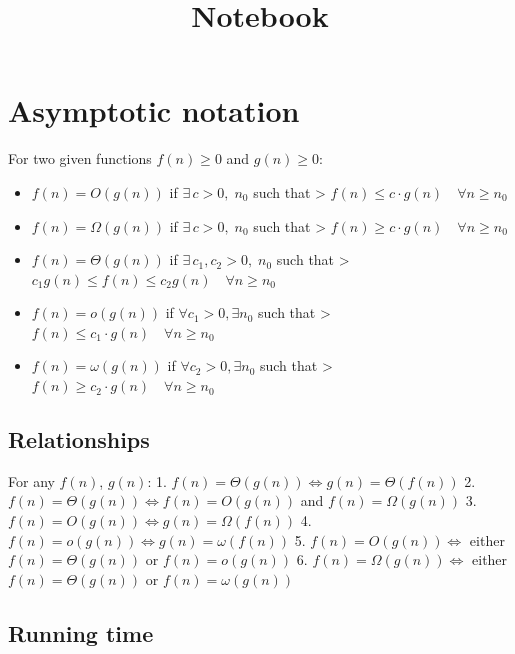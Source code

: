 \documentclass[11pt]{article}
\title{Notebook}
\date{}
\begin{document}
    
    \maketitle
    
    

    \tableofcontents
    \newpage

    
    \section{Asymptotic notation}\label{asymptotic-notation}

For two given functions \(f(n) \geq 0\) and \(g(n) \geq 0\):

\begin{itemize}
\item
  \(f(n) = O(g(n))\) if \(\exists\, c > 0,\; n_0\) such that
  \textgreater{} \(f(n) \le c \cdot g(n) \quad \forall n \ge n_0\)
\item
  \(f(n) = \Omega(g(n))\) if \(\exists\, c > 0,\; n_0\) such that
  \textgreater{} \(f(n) \ge c \cdot g(n) \quad \forall n \ge n_0\)
\item
  \(f(n) = \Theta(g(n))\) if \(\exists\, c_1, c_2 > 0,\; n_0\) such that
  \textgreater{}
  \(c_1 g(n) \le f(n) \le c_2 g(n) \quad \forall n \ge n_0\)
\item
  \(f(n) = o(g(n))\) if \(\forall c_1 > 0, \exists n_0\) such that
  \textgreater{} \(f(n) \le c_1 \cdot g(n) \quad \forall n \ge n_0\)
\item
  \(f(n) = \omega(g(n))\) if \(\forall c_2 > 0, \exists n_0\) such that
  \textgreater{} \(f(n) \ge c_2 \cdot g(n) \quad \forall n \ge n_0\)
\end{itemize}

    \subsection{Relationships}\label{relationships}

For any \(f(n)\), \(g(n)\): 1.
\(f(n) = \Theta(g(n)) \iff g(n) = \Theta(f(n))\) 2.
\(f(n) = \Theta(g(n)) \iff f(n) = O(g(n))\) and \(f(n) = \Omega(g(n))\)
3. \(f(n) = O(g(n)) \iff g(n) = \Omega(f(n))\) 4.
\(f(n) = o(g(n)) \iff g(n) = \omega(f(n))\) 5. \(f(n) = O(g(n)) \iff\)
either \(f(n) = \Theta(g(n))\) or \(f(n) = o(g(n))\) 6.
\(f(n) = \Omega(g(n)) \iff\) either \(f(n) = \Theta(g(n))\) or
\(f(n) = \omega(g(n))\)

    \subsection{Running time}\label{running-time}
\end{document}
